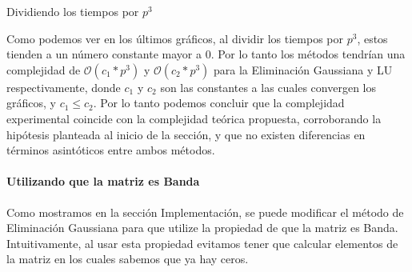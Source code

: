 \begin{center}
    \caption{Dividiendo los tiempos por $p^3$}
\end{center}

Como podemos ver en los últimos gráficos, al dividir los tiempos por $p^3$, estos tienden a un número constante mayor a 0. Por lo tanto los métodos tendrían una complejidad
de $\mathcal{O}(c_{1}*p^3)$ y $\mathcal{O}(c_{2}*p^3)$ para la Eliminación Gaussiana y LU respectivamente, donde $c_{1}$ y $c_{2}$ son las constantes a las cuales convergen los gráficos, y $c_{1} \leq c_{2}$.
Por lo tanto podemos concluir que la complejidad experimental coincide con la complejidad teórica propuesta, corroborando la hipótesis planteada al inicio de la sección, y que no existen diferencias en términos asintóticos entre ambos métodos.

\paragraph{Utilizando que la matriz es Banda}

Como mostramos en la sección Implementación, se puede modificar el método de Eliminación Gaussiana para que utilize la propiedad de que la matriz es Banda.
Intuitivamente, al usar esta propiedad evitamos tener que calcular elementos de la matriz en los cuales sabemos que ya hay ceros.

